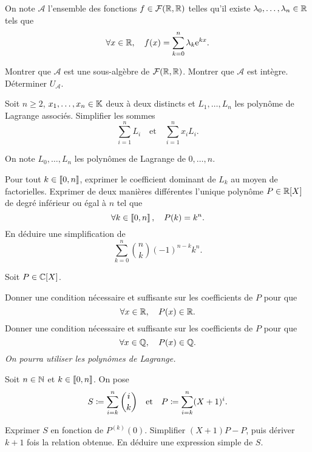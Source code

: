 \documentclass{magnolia}
\begin{document}
On note $\mathcal{A}$ l'ensemble des fonctions $f\in\mathcal{F}(\mathbb{R},\mathbb{R})$ telles qu'il
existe $\lambda_0,\ldots,\lambda_n\in\mathbb{R}$ tels que
\[\forall x\in\mathbb{R},\quad f(x)=\sum_{k=0}^n \lambda_k {\rm e}^{kx}.\]
\begin{questions}
\question Montrer que $\mathcal{A}$ est une sous-algèbre de $\mathcal{F}(\mathbb{R},\mathbb{R})$.
\question Montrer que $\mathcal{A}$ est intègre.
\question Déterminer $U_{\mathcal{A}}$. 
\end{questions}


Soit $n\geq 2$, $x_1,\ldots,x_n\in\mathbb{K}$ deux à deux distincts et $L_1,\ldots,L_n$ les
polynôme de Lagrange associés. Simplifier les sommes
\[\sum_{i=1}^n L_i \quad\text{et}\quad \sum_{i=1}^n x_i L_i.\]

On note $L_0,\ldots,L_n$ les polynômes de Lagrange de $0,\ldots,n$.
\begin{questions}
\question Pour tout $k\in\left\llbracket 0,n\right\rrbracket$, exprimer le coefficient dominant de $L_k$ au
  moyen de factorielles.
\question Exprimer de deux manières différentes l'unique polynôme $P\in\polyR$ de degré
  inférieur ou égal à $n$ tel que
  \[\forall k\in\left\llbracket 0,n\right\rrbracket,\quad P(k)=k^n.\]
\question En déduire une simplification de
  \[\sum_{k=0}^n \binom{n}{k}(-1)^{n-k} k^n.\]
\end{questions}


Soit $P\in\polyC$.
\begin{questions}
\question Donner une condition nécessaire et suffisante sur les coefficients de $P$
  pour que \[\forall x\in\mathbb{R},\quad P(x)\in\mathbb{R}.\]
\question Donner une condition nécessaire et suffisante sur les coefficients de $P$
  pour que \[\forall x\in\mathbb{Q},\quad P(x)\in\mathbb{Q}.\]
  \emph{On pourra utiliser les polynômes de Lagrange.}
\end{questions}



Soit $n\in\mathbb{N}$ et $k\in\left\llbracket 0,n\right\rrbracket$. On pose
\[S\coloneqq\sum_{i=k}^n \binom{i}{k} \quad\text{et}\quad
  P\coloneqq\sum_{i=k}^n (X+1)^i.\]
\begin{questions}
\question Exprimer $S$ en fonction de $P^{(k)}(0)$.
\question Simplifier $(X+1)P - P$, puis dériver $k+1$ fois la
  relation obtenue.
\question En déduire une expression simple de $S$.
\end{questions}
\end{document}
